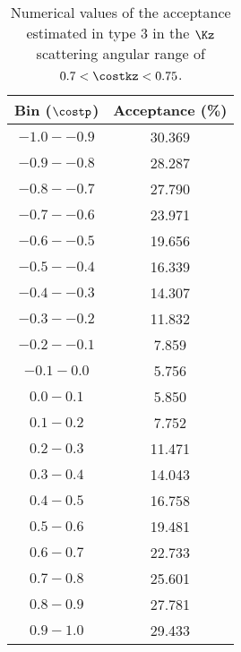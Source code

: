 \begin{table}[!h] 
  \begin{center}
  \caption{Numerical values of the acceptance estimated in type 3 in the $\Kz$ scattering angular range of \textbf{$0.7<\costkz<0.75$}.}
  \centering
  \begin{threeparttable}
    \begin{tabular}{cc}
    Bin ($\costp$) & Acceptance (\%) \\
    \midrule\midrule
    $-1.0 - -0.9$ & 30.369 \\
    \midrule
    $-0.9 - -0.8$ & 28.287 \\
    \midrule
    $-0.8 - -0.7$ & 27.790 \\
    \midrule
    $-0.7 - -0.6$ & 23.971 \\
    \midrule
    $-0.6 - -0.5$ & 19.656 \\
    \midrule
    $-0.5 - -0.4$ & 16.339 \\
    \midrule
    $-0.4 - -0.3$ & 14.307 \\
    \midrule
    $-0.3 - -0.2$ & 11.832 \\
    \midrule
    $-0.2 - -0.1$ & 7.859 \\
    \midrule
    $-0.1 - 0.0$ & 5.756 \\
    \midrule
    $0.0 - 0.1$ & 5.850 \\
    \midrule
    $0.1 - 0.2$ & 7.752 \\
    \midrule
    $0.2 - 0.3$ & 11.471 \\
    \midrule
    $0.3 - 0.4$ & 14.043 \\
    \midrule
    $0.4 - 0.5$ & 16.758 \\
    \midrule
    $0.5 - 0.6$ & 19.481 \\
    \midrule
    $0.6 - 0.7$ & 22.733 \\
    \midrule
    $0.7 - 0.8$ & 25.601 \\
    \midrule
    $0.8 - 0.9$ & 27.781 \\
    \midrule
    $0.9 - 1.0$ & 29.433 \\
    \end{tabular}
  \end{threeparttable}
  \label{tab-Pl-acc_34}
  \end{center}
\end{table}


